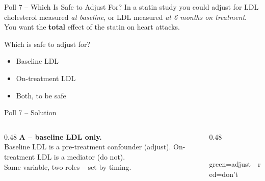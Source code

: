 \documentclass[aspectratio=169]{beamer}
\begin{document}
\begin{frame}{Poll 7 \;--\; Which Is Safe to Adjust For?}
  \small
  In a statin study you could adjust for LDL cholesterol measured \emph{at
  baseline}, or LDL measured \emph{at 6 months on treatment}. You want the
  \textbf{total} effect of the statin on heart attacks.
  \vspace{0.8em}

  Which is safe to adjust for?
  \begin{itemize}
    \item[\textbf{A.}] Baseline LDL
    \item[\textbf{B.}] On-treatment LDL
    \item[\textbf{C.}] Both, to be safe
  \end{itemize}
\end{frame}

\begin{frame}{Poll 7 \;--\; Solution}
  \small
  \begin{columns}[T]
    \begin{column}{0.48\textwidth}
      \textcolor{good}{\textbf{A -- baseline LDL only.}}\\[0.4em]
      \textcolor{good}{Baseline LDL} is a pre-treatment confounder (adjust).
      \textcolor{brick}{On-treatment LDL} is a mediator (do not).\\[0.3em]
      Same variable, two roles -- set by timing.
    \end{column}
    \begin{column}{0.48\textwidth}
      \centering
      \\[0.2em]
      {\scriptsize\textcolor{good}{green=adjust}\ \ \textcolor{brick}{red=don't}}
    \end{column}
  \end{columns}
\end{frame}
\end{document}
